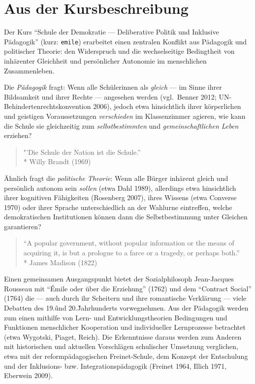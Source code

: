 \section[Kursbeschreibung]{Aus der Kursbeschreibung}

Der Kurs ``Schule der Demokratie --- Deliberative Politik und Inklusive Pädagogik'' (kurz: \lstinline{emile}) erarbeitet einen zentralen Konflikt aus Pädagogik und politischer Theorie:
den Widerspruch und die wechselseitige Bedingtheit von inhärenter Gleichheit und persönlicher Autonomie im menschlichen Zusammenleben.

Die \emph{Pädagogik} fragt:
Wenn alle Schülerinnen als \emph{gleich} --- im Sinne ihrer Bildsamkeit und ihrer Rechte --- angesehen werden (vgl.\ Benner 2012; UN-Behindertenrechtskonvention 2006),
jedoch etwa hinsichtlich ihrer körperlichen und geistigen Voraussetzungen \emph{verschieden} im Klassenzimmer agieren, wie kann die Schule sie gleichzeitig zum \emph{selbstbestimmten} und \emph{gemeinschaftlichen Leben} erziehen?

\begin{quote}
    "’Die Schule der Nation ist die Schule.''\\*
    Willy Brandt (1969)
\end{quote}

Ähnlich fragt die \emph{politische Theorie}:
Wenn alle Bürger inhärent gleich und persönlich autonom sein \emph{sollen} (etwa Dahl 1989), allerdings etwa hinsichtlich ihrer kognitiven Fähigkeiten (Rosenberg 2007), ihres Wissens (etwa Converse 1970) oder ihrer Sprache unterschiedlich an der Wahlurne eintreffen, welche demokratischen Institutionen können dann die Selbstbestimmung unter Gleichen garantieren?

\begin{quote}
    ``A popular government, without popular information or the means of acquiring it, is but a prologue to a farce or a tragedy, or perhaps both.''\\*
    James Madison (1822)
\end{quote}

Einen gemeinsamen Ausgangspunkt bietet der Sozialphilosoph Jean-Jacques Rousseau mit ``Émile oder über die Erziehung'' (1762) und dem ``Contract Social'' (1764) die --- auch durch ihr Scheitern und ihre romantische Verklärung --- viele Debatten des 19.\~ und 20.\~ Jahrhunderts vorwegnehmen.
Aus der Pädagogik werden zum einen mithilfe von Lern- und Entwicklungstheorien Bedingungen und Funktionen menschlicher Kooperation und individueller Lernprozesse betrachtet (etwa Wygotski, Piaget, Reich).
Die Erkenntnisse daraus werden zum Anderen mit historischen und aktuellen Vorschlägen schulischer Umsetzung verglichen, etwa mit der reformpädagogischen Freinet-Schule, dem Konzept der Entschulung und der Inklusions- bzw. Integrationspädagogik (Freinet 1964, Illich 1971, Eberwein 2009).

